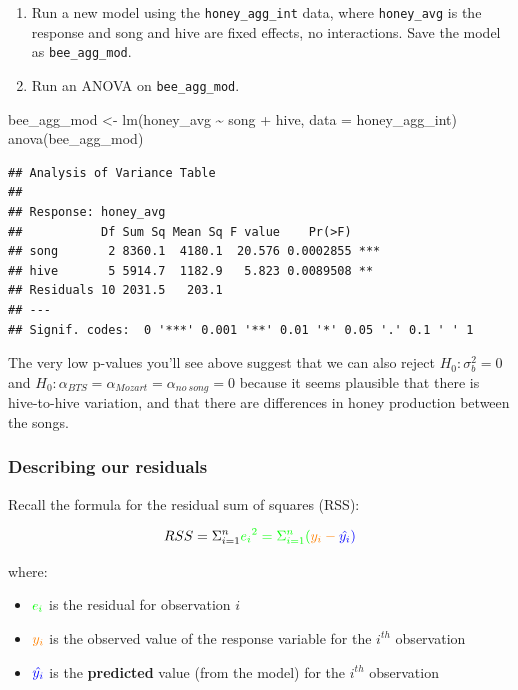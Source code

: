 \documentclass[
  openany]{book}
\newenvironment{Shaded}{\begin{snugshade}}{\end{snugshade}}
\newcommand{\AttributeTok}[1]{\textcolor[rgb]{0.77,0.63,0.00}{#1}}
\newcommand{\FunctionTok}[1]{\textcolor[rgb]{0.00,0.00,0.00}{#1}}
\newcommand{\NormalTok}[1]{#1}
\newcommand{\OtherTok}[1]{\textcolor[rgb]{0.56,0.35,0.01}{#1}}
\newcommand{\SpecialCharTok}[1]{\textcolor[rgb]{0.00,0.00,0.00}{#1}}
\providecommand{\tightlist}{%
  \setlength{\itemsep}{0pt}\setlength{\parskip}{0pt}}
\begin{document}
\begin{enumerate}
\def\labelenumi{\arabic{enumi}.}
\tightlist
\item
  Run a new model using the \texttt{honey\_agg\_int} data, where \texttt{honey\_avg} is the response and song and hive are fixed effects, no interactions. Save the model as \texttt{bee\_agg\_mod}.
\item
  Run an ANOVA on \texttt{bee\_agg\_mod}.
\end{enumerate}

\begin{Shaded}
\begin{Highlighting}[]
\NormalTok{bee\_agg\_mod }\OtherTok{\textless{}{-}} \FunctionTok{lm}\NormalTok{(honey\_avg }\SpecialCharTok{\textasciitilde{}}\NormalTok{ song }\SpecialCharTok{+}\NormalTok{ hive, }\AttributeTok{data =}\NormalTok{ honey\_agg\_int)}
\FunctionTok{anova}\NormalTok{(bee\_agg\_mod)}
\end{Highlighting}
\end{Shaded}

\begin{verbatim}
## Analysis of Variance Table
## 
## Response: honey_avg
##           Df Sum Sq Mean Sq F value    Pr(>F)    
## song       2 8360.1  4180.1  20.576 0.0002855 ***
## hive       5 5914.7  1182.9   5.823 0.0089508 ** 
## Residuals 10 2031.5   203.1                      
## ---
## Signif. codes:  0 '***' 0.001 '**' 0.01 '*' 0.05 '.' 0.1 ' ' 1
\end{verbatim}

The very low p-values you'll see above suggest that we can also reject \(H_0: \sigma^2_b = 0\) and \(H_0: \alpha_{BTS} = \alpha_{Mozart} = \alpha_{no\ song} = 0\) because it seems plausible that there is hive-to-hive variation, and that there are differences in honey production between the songs.

\hypertarget{describing-our-residuals}{%
\subsubsection{Describing our residuals}\label{describing-our-residuals}}

Recall the formula for the residual sum of squares (RSS):

\[RSS = \Sigma^{n}_{i=1} \color{green}{e_i}^2 = \Sigma^{n}_{i=1} (\color{orange}{y_i} - \color{blue}{\hat{y_i}})\]

where:

\begin{itemize}
\tightlist
\item
  \(\color{green}{e_i}\) is the residual for observation \(i\)\\
\item
  \(\color{orange}{y_i}\) is the observed value of the response variable for the \(i^{th}\) observation\\
\item
  \(\color{blue}{\hat{y_i}}\) is the \textbf{predicted} value (from the model) for the \(i^{th}\) observation
\end{itemize}
\end{document}
